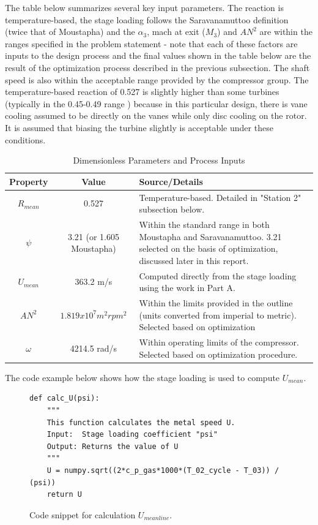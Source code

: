 \documentclass[12pt, letter]{report}
\begin{document}
The table below summarizes several key input parameters. The reaction is temperature-based, the stage loading follows the Saravanamuttoo definition (twice that of Moustapha) and the $\alpha_3$, mach at exit ($M_3$) and $AN^2$ are within the ranges specified in the problem statement - note that each of these factors are inputs to the design process and the final values shown in the table below are the result of the optimization process described in the previous subsection. The shaft speed is also within the acceptable range provided by the compressor group. The temperature-based reaction of 0.527 is slightly higher than some turbines (typically in the 0.45-0.49 range \cite{saravanamuttoo2017}) because in this particular design, there is vane cooling assumed to be directly on the vanes while only disc cooling on the rotor. It is assumed that biasing the turbine slightly is acceptable under these conditions. \par

\begin{table}[H]
\caption{Dimensionless Parameters and Process Inputs}
\centering
\begin{tabular}{|c|c|p{}|}
\hline
\textbf{Property} & \textbf{Value} & \textbf{Source/Details}\\ \hline
$R_{mean}$ & 0.527 & Temperature-based. Detailed in "Station 2" subsection below. \\ \hline
$\psi$ & 3.21 (or 1.605 Moustapha) & Within the standard range in both Moustapha and Saravanamuttoo. 3.21 selected on the basis of optimization, discussed later in this report. \\ \hline
$U_{mean}$ & 363.2 m/s & Computed directly from the stage loading using the work in Part A.\\ \hline
$AN^2$ & $1.819x10^7 m^{2}rpm^{2}$ & Within the limits provided in the outline (units converted from imperial to metric). Selected based on optimization\\ \hline
$\omega$ & 4214.5 rad/s & Within operating limits of the compressor. Selected based on optimization procedure. \\ \hline
\end{tabular}
\label{tab:my_label}
\end{table}
\par

The code example below shows how the stage loading is used to compute $U_{mean}$.
\begin{figure}[H]
    \begin{verbatim}
def calc_U(psi):
    """
    This function calculates the metal speed U.
    Input:  Stage loading coefficient "psi"
    Output: Returns the value of U
    """
    U = numpy.sqrt((2*c_p_gas*1000*(T_02_cycle - T_03)) / (psi))
    return U
    \end{verbatim}
    \caption{Code snippet for calculation $U_{meanline}$.}
    \label{fig:code_U_meanline}
\end{figure}
\end{document}
